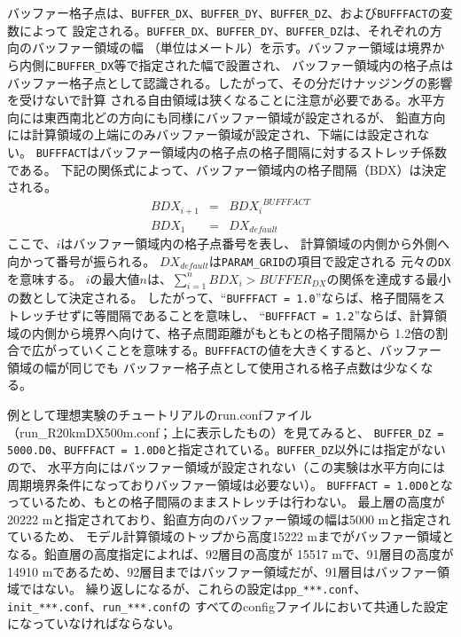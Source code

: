 バッファー格子点は、\verb|BUFFER_DX|、\verb|BUFFER_DY|、\verb|BUFFER_DZ|、および\verb|BUFFFACT|の変数によって
設定される。\verb|BUFFER_DX|、\verb|BUFFER_DY|、\verb|BUFFER_DZ|は、それぞれの方向のバッファー領域の幅
（単位はメートル）を示す。バッファー領域は境界から内側に\verb|BUFFER_DX|等で指定された幅で設置され、
バッファー領域内の格子点はバッファー格子点として認識される。したがって、その分だけナッジングの影響を受けないで計算
される自由領域は狭くなることに注意が必要である。水平方向には東西南北どの方向にも同様にバッファー領域が設定されるが、
鉛直方向には計算領域の上端にのみバッファー領域が設定され、下端には設定されない。
\verb|BUFFFACT|はバッファー領域内の格子点の格子間隔に対するストレッチ係数である。
下記の関係式によって、バッファー領域内の格子間隔（BDX）は決定される。
\begin{eqnarray}
BDX_{i+1}&=&{BDX_{i}}^{BUFFFACT} \nonumber \\
BDX_{1}&=&DX_{default} \nonumber
\end{eqnarray}
ここで、$i$はバッファー領域内の格子点番号を表し、
計算領域の内側から外側へ向かって番号が振られる。
$DX_{default}$は\verb|PARAM_GRID|の項目で設定される
元々の\verb|DX|を意味する。
$i$の最大値$n$は、$\sum_{i=1}^n BDX_{i} > BUFFER_{DX}$の関係を達成する最小の数として決定される。
したがって、``\verb|BUFFFACT = 1.0|''ならば、格子間隔をストレッチせずに等間隔であることを意味し、
``\verb|BUFFFACT = 1.2|''ならば、計算領域の内側から境界へ向けて、格子点間距離がもともとの格子間隔から
1.2倍の割合で広がっていくことを意味する。\verb|BUFFFACT|の値を大きくすると、バッファー領域の幅が同じでも
バッファー格子点として使用される格子点数は少なくなる。

例として理想実験のチュートリアルのrun.confファイル（run\_R20kmDX500m.conf；上に表示したもの）を見てみると、
\verb|BUFFER_DZ = 5000.D0|、\verb|BUFFFACT = 1.0D0|と指定されている。\verb|BUFFER_DZ|以外には指定がないので、
水平方向にはバッファー領域が設定されない（この実験は水平方向には周期境界条件になっておりバッファー領域は必要ない）。
\verb|BUFFFACT = 1.0D0|となっているため、もとの格子間隔のままストレッチは行わない。
最上層の高度が20222 mと指定されており、鉛直方向のバッファー領域の幅は5000 mと指定されているため、
モデル計算領域のトップから高度15222 mまでがバッファー領域となる。鉛直層の高度指定によれば、92層目の高度が
15517 mで、91層目の高度が14910 mであるため、92層目まではバッファー領域だが、91層目はバッファー領域ではない。
繰り返しになるが、これらの設定は\verb|pp_***.conf|、\verb|init_***.conf|、\verb|run_***.conf|の
すべてのconfigファイルにおいて共通した設定になっていなければならない。

